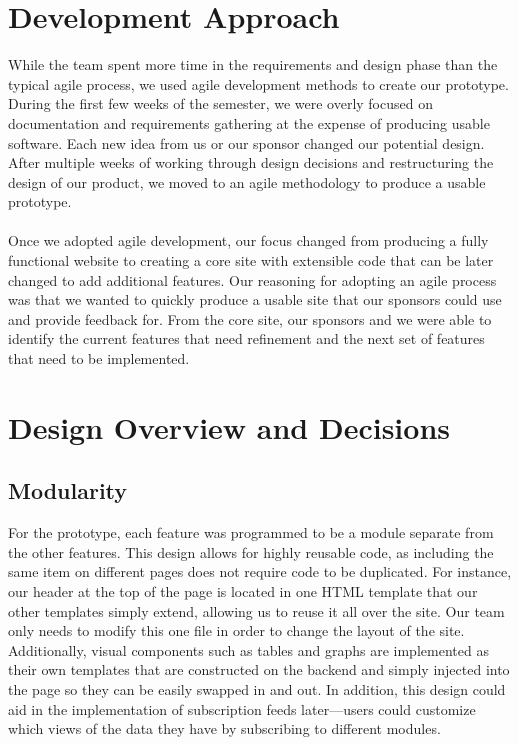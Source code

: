 \documentclass[12pt]{article}
\begin{document}
\begin{spacing}{1.5}
\section{Development Approach}
 While the team spent more time in the requirements and design phase than the typical agile process, we used agile development methods to create our prototype. During the first few weeks of the semester, we were overly focused on documentation and requirements gathering at the expense of producing usable software. Each new idea from us or our sponsor changed our potential design. After multiple weeks of working through design decisions and restructuring the design of our product, we moved to an agile methodology to produce a usable prototype.
\\ \\
Once we adopted agile development, our focus changed from producing a fully functional website to creating a core site with extensible code that can be later changed to add additional features. Our reasoning for adopting an agile process was that we wanted to quickly produce a usable site that our sponsors could use and provide feedback for. From the core site, our sponsors and we were able to identify the current features that need refinement and the next set of features that need to be implemented.


\section{Design Overview and Decisions}
\subsection{Modularity}
For the prototype, each feature was programmed to be a module separate from the other features. This design allows for highly reusable code, as including the same item on different pages does not require code to be duplicated. For instance, our header at the top of the page is located in one HTML template that our other templates simply extend, allowing us to reuse it all over the site. Our team only needs to modify this one file in order to change the layout of the site. Additionally, visual components such as tables and graphs are implemented as their own templates that are constructed on the backend and simply injected into the page so they can be easily swapped in and out. In addition, this design could aid in the implementation of subscription feeds later---users could customize which views of the data they have by subscribing to different modules.


\end{spacing}
\end{document}
